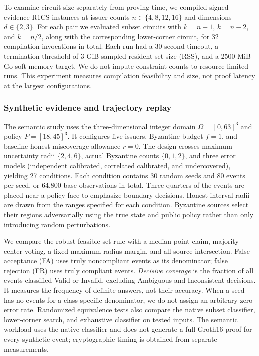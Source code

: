 To examine circuit size separately from proving time, we compiled signed-evidence R1CS instances at issuer counts $n\in\{4,8,12,16\}$ and dimensions $d\in\{2,3\}$. For each pair we evaluated subset circuits with $k=n-1$, $k=n-2$, and $k=n/2$, along with the corresponding lower-corner circuit, for 32 compilation invocations in total. Each run had a 30-second timeout, a termination threshold of 3 GiB sampled resident set size (RSS), and a 2500 MiB Go soft memory target. We do not impute constraint counts to resource-limited runs. This experiment measures compilation feasibility and size, not proof latency at the largest configurations.

\subsubsection{Synthetic evidence and trajectory replay}
The semantic study uses the three-dimensional integer domain $\Omega=[0,63]^3$ and policy $P=[18,45]^3$. It configures five issuers, Byzantine budget $f=1$, and baseline honest-miscoverage allowance $r=0$. The design crosses maximum uncertainty radii $\{2,4,6\}$, actual Byzantine counts $\{0,1,2\}$, and three error models (independent calibrated, correlated calibrated, and undercovered), yielding 27 conditions. Each condition contains 30 random seeds and 80 events per seed, or 64,800 base observations in total. Three quarters of the events are placed near a policy face to emphasize boundary decisions. Honest interval radii are drawn from the ranges specified for each condition. Byzantine sources select their regions adversarially using the true state and public policy rather than only introducing random perturbations.

We compare the robust feasible-set rule with a median point claim, majority-center voting, a fixed maximum-radius margin, and all-source intersection. False acceptance (FA) uses truly noncompliant events as its denominator; false rejection (FR) uses truly compliant events. \emph{Decisive coverage} is the fraction of all events classified Valid or Invalid, excluding Ambiguous and Inconsistent decisions. It measures the frequency of definite answers, not their accuracy. When a seed has no events for a class-specific denominator, we do not assign an arbitrary zero error rate. Randomized equivalence tests also compare the native subset classifier, lower-corner search, and exhaustive classifier on tested inputs. The semantic workload uses the native classifier and does not generate a full Groth16 proof for every synthetic event; cryptographic timing is obtained from separate measurements.

